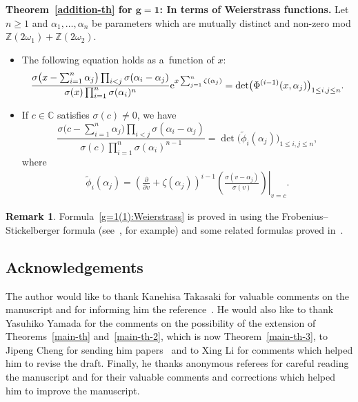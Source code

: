 \documentclass[10pt,a4paper]{amsart}
\numberwithin{equation}{section}
\theoremstyle{definition}
\newtheorem{Remark}[Theorem]{Remark}
\begin{document}
{\bf Theorem~\ref{addition-th} for $\boldsymbol{ g=1}$: In terms of Weierstrass functions.}
Let $n\geq 1$ and $\alpha_1,\dots ,\alpha_n$ be parameters which are mutually distinct and non-zero
mod $\mathbb{Z}(2\omega_1)+\mathbb{Z}(2\omega_2)$.
\begin{itemize}
\item[(1)] The following equation holds as a~function of $x$:
\begin{gather}
\frac{\sigma\bigl(x-\sum_{i=1}^n \alpha_j\bigr)\prod_{i<j}\sigma(\alpha_i-\alpha_j)}
{\sigma(x)\prod_{i=1}^n\sigma(\alpha_i)^n}
{\rm e}^{x\sum_{j=1}^n\zeta(\alpha_j)}
=
\det\bigl(\Phi^{(i-1)}(x,\alpha_j)\bigr)_{1\leq i,j\leq n}.
\label{g=1(1):Weierstrass}
\end{gather}

\item[(2)] If $c\in\mathbb{C}$ satisfies $\sigma(c)\neq 0$, we have
\[%
\frac{\sigma\bigl(c-\sum_{i=1}^n \alpha_j\bigr)\prod_{i<j}\sigma(\alpha_i-\alpha_j)}
{\sigma(c)\prod_{i=1}^n\sigma(\alpha_i)^{n-1}}
=
\det\bigl(
\tilde{\phi}_{i}(\alpha_j)
\bigr)_{1\leq i,j\leq n},
\]
where
\begin{gather*}
\tilde{\phi}_{i}(\alpha_j)=\left(\frac{\partial}{\partial v}+\zeta(\alpha_j)\right)^{i-1}
\left.\left(\frac{\sigma(v-\alpha_j)}{\sigma(v)}\right)\right|_{v=c}.
\end{gather*}
\end{itemize}

\begin{Remark} Formula~\eqref{g=1(1):Weierstrass} is proved in \cite[Lemma 3.1]{Li-Zhang2022}
using the Frobenius--Stickelberger formula (see~\cite{Whittaker-Watson1902}, for example) and some related formulas proved in~\cite{DN2018,NSZ2019}.
\end{Remark}


\subsection*{Acknowledgements}

The author would like to thank Kanehisa Takasaki for valuable comments on the manuscript and for informing him the reference~\cite{Zabrodin2025}. He would also like to thank Yasuhiko Yamada for the comments on the possibility of the extension of Theorems~\ref{main-th} and~\ref{main-th-2}, which is now Theorem~\ref{main-th-3}, to Jipeng Cheng for
sending him papers~\cite{He-Li-Cheng2002,Wang-Chen-Cheng2025} and
to Xing Li for comments which helped him to revise the draft.
Finally, he thanks anonymous referees for careful reading the manuscript and for their valuable comments and corrections which helped him to improve the manuscript.
\end{document}
